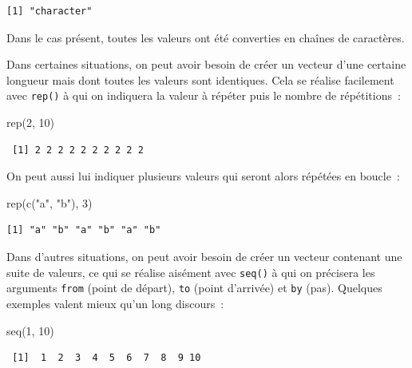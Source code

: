 \documentclass[
  letterpaper,
  DIV=11,
  numbers=noendperiod,
  oneside]{scrreprt}
\newenvironment{Shaded}{\begin{snugshade}}{\end{snugshade}}
\newcommand{\DecValTok}[1]{\textcolor[rgb]{0.68,0.00,0.00}{#1}}
\newcommand{\FunctionTok}[1]{\textcolor[rgb]{0.28,0.35,0.67}{#1}}
\newcommand{\NormalTok}[1]{\textcolor[rgb]{0.00,0.23,0.31}{#1}}
\newcommand{\StringTok}[1]{\textcolor[rgb]{0.13,0.47,0.30}{#1}}
\begin{document}
\begin{verbatim}
[1] "character"
\end{verbatim}

Dans le cas présent, toutes les valeurs ont été converties en chaînes de
caractères.

Dans certaines situations, on peut avoir besoin de créer un vecteur
d'une certaine longueur mais dont toutes les valeurs sont identiques.
Cela se réalise facilement avec \texttt{rep()} à qui on indiquera la
valeur à répéter puis le nombre de répétitions~:

\begin{Shaded}
\begin{Highlighting}[]
\FunctionTok{rep}\NormalTok{(}\DecValTok{2}\NormalTok{, }\DecValTok{10}\NormalTok{)}
\end{Highlighting}
\end{Shaded}

\begin{verbatim}
 [1] 2 2 2 2 2 2 2 2 2 2
\end{verbatim}

On peut aussi lui indiquer plusieurs valeurs qui seront alors répétées
en boucle~:

\begin{Shaded}
\begin{Highlighting}[]
\FunctionTok{rep}\NormalTok{(}\FunctionTok{c}\NormalTok{(}\StringTok{"a"}\NormalTok{, }\StringTok{"b"}\NormalTok{), }\DecValTok{3}\NormalTok{)}
\end{Highlighting}
\end{Shaded}

\begin{verbatim}
[1] "a" "b" "a" "b" "a" "b"
\end{verbatim}

Dans d'autres situations, on peut avoir besoin de créer un vecteur
contenant une suite de valeurs, ce qui se réalise aisément avec
\texttt{seq()} à qui on précisera les arguments \texttt{from} (point de
départ), \texttt{to} (point d'arrivée) et \texttt{by} (pas). Quelques
exemples valent mieux qu'un long discours~:

\begin{Shaded}
\begin{Highlighting}[]
\FunctionTok{seq}\NormalTok{(}\DecValTok{1}\NormalTok{, }\DecValTok{10}\NormalTok{)}
\end{Highlighting}
\end{Shaded}

\begin{verbatim}
 [1]  1  2  3  4  5  6  7  8  9 10
\end{verbatim}
\end{document}
